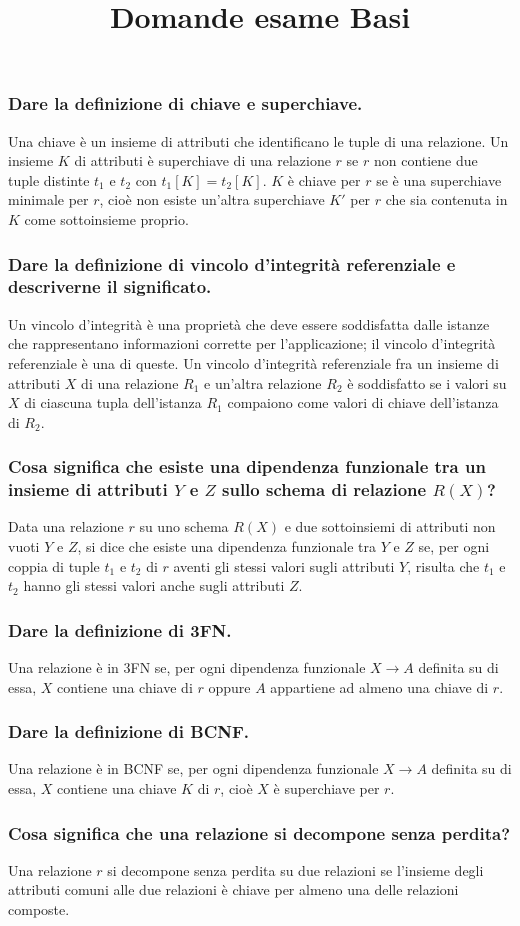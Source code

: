 \documentclass[11pt]{article}
\title{Domande esame Basi}
\begin{document}
\subsubsection*{Dare la definizione di chiave e superchiave.}
Una chiave è un insieme di attributi che identificano le tuple di una relazione. Un insieme $K$ di attributi è superchiave 
di una relazione $r$ se $r$ non contiene due tuple distinte $t_1$ e $t_2$ con $t_1[K]=t_2[K]$. $K$ è chiave per $r$ se è
una superchiave minimale per $r$, cioè non esiste un'altra superchiave $K'$ per $r$ che sia contenuta in $K$ come sottoinsieme 
proprio.
\subsubsection*{Dare la definizione di vincolo d'integrità referenziale e descriverne il significato.}
Un vincolo d'integrità è una proprietà che deve essere soddisfatta dalle istanze che rappresentano informazioni corrette 
per l'applicazione; il vincolo d'integrità referenziale è una di queste. Un vincolo d'integrità referenziale fra un insieme 
di attributi $X$ di una relazione $R_1$ e un'altra relazione $R_2$ è soddisfatto se i valori su $X$ di ciascuna tupla 
dell'istanza $R_1$ compaiono come valori di chiave dell'istanza di $R_2$.
\subsubsection*{Cosa significa che esiste una dipendenza funzionale tra un insieme di attributi $Y$ e $Z$ sullo schema di
relazione $R(X)$?}
Data una relazione $r$ su uno schema $R(X)$ e due sottoinsiemi di attributi non vuoti $Y$ e $Z$, si dice che esiste una
dipendenza funzionale tra $Y$ e $Z$ se, per ogni coppia di tuple $t_1$ e $t_2$ di $r$ aventi gli stessi valori sugli 
attributi $Y$, risulta che $t_1$ e $t_2$ hanno gli stessi valori anche sugli attributi $Z$. 
\subsubsection*{Dare la definizione di 3FN.}
Una relazione è in 3FN se, per ogni dipendenza funzionale $X\rightarrow A$ definita su di essa, $X$ contiene una chiave 
di $r$ oppure $A$ appartiene ad almeno una chiave di $r$.
\subsubsection*{Dare la definizione di BCNF.}
Una relazione è in BCNF se, per ogni dipendenza funzionale $X\rightarrow A$ definita su di essa, $X$ contiene una chiave 
$K$ di $r$, cioè $X$ è superchiave per $r$.
\subsubsection*{Cosa significa che una relazione si decompone senza perdita?}
Una relazione $r$ si decompone senza perdita su due relazioni se l'insieme degli attributi comuni alle due relazioni è 
chiave per almeno una delle relazioni composte.
\end{document}
